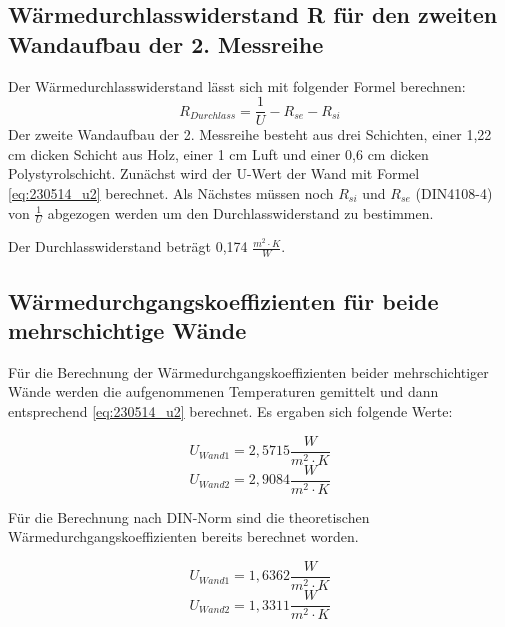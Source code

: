 \subsection{Wärmedurchlasswiderstand R für den zweiten Wandaufbau der 2. Messreihe}
Der Wärmedurchlasswiderstand lässt sich mit folgender Formel berechnen:
%
\begin{equation}
R_{Durchlass}=\frac{1} {U} - R_{se} - R_{si}
  \label{eq:230522_Wärmewiderstand}
\end{equation}
%
Der zweite Wandaufbau der 2. Messreihe besteht aus drei Schichten, einer 1,22 cm dicken Schicht aus Holz, einer 1 cm Luft und einer 0,6 cm dicken Polystyrolschicht. 
Zunächst wird der U-Wert der Wand mit Formel \ref{eq:230514_u2}  berechnet. Als Nächstes müssen noch $R_{si}$ und $R_{se}$ (DIN4108-4) von  $\frac{1}{U}$ abgezogen werden um den Durchlasswiderstand zu bestimmen. 

Der Durchlasswiderstand beträgt 0,174 $\frac{ m^2 \cdot K }{W}$. 

\subsection{Wärmedurchgangskoeffizienten für beide mehrschichtige Wände}
Für die Berechnung der Wärmedurchgangskoeffizienten beider mehrschichtiger Wände werden die aufgenommenen Temperaturen gemittelt und dann entsprechend \autoref{eq:230514_u2} berechnet.
Es ergaben sich folgende Werte:

\begin{equation*}
  U_{Wand 1} = 2,5715 \frac{W}{m^2 \cdot K}
\end{equation*}
\begin{equation*}
  U_{Wand 2} = 2,9084 \frac{W}{m^2 \cdot K}
\end{equation*}

Für die Berechnung nach DIN-Norm sind die theoretischen Wärmedurchgangskoeffizienten bereits berechnet worden.


\begin{equation*}
  U_{Wand 1}=1,6362 \frac{W}{m^2 \cdot K}
\end{equation*}
\begin{equation*}
  U_{Wand 2}=1,3311 \frac{W}{m^2 \cdot K}
\end{equation*}

